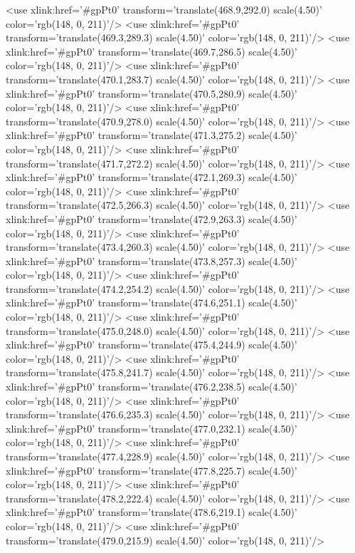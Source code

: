 	<use xlink:href='#gpPt0' transform='translate(468.9,292.0) scale(4.50)' color='rgb(148,   0, 211)'/>
	<use xlink:href='#gpPt0' transform='translate(469.3,289.3) scale(4.50)' color='rgb(148,   0, 211)'/>
	<use xlink:href='#gpPt0' transform='translate(469.7,286.5) scale(4.50)' color='rgb(148,   0, 211)'/>
	<use xlink:href='#gpPt0' transform='translate(470.1,283.7) scale(4.50)' color='rgb(148,   0, 211)'/>
	<use xlink:href='#gpPt0' transform='translate(470.5,280.9) scale(4.50)' color='rgb(148,   0, 211)'/>
	<use xlink:href='#gpPt0' transform='translate(470.9,278.0) scale(4.50)' color='rgb(148,   0, 211)'/>
	<use xlink:href='#gpPt0' transform='translate(471.3,275.2) scale(4.50)' color='rgb(148,   0, 211)'/>
	<use xlink:href='#gpPt0' transform='translate(471.7,272.2) scale(4.50)' color='rgb(148,   0, 211)'/>
	<use xlink:href='#gpPt0' transform='translate(472.1,269.3) scale(4.50)' color='rgb(148,   0, 211)'/>
	<use xlink:href='#gpPt0' transform='translate(472.5,266.3) scale(4.50)' color='rgb(148,   0, 211)'/>
	<use xlink:href='#gpPt0' transform='translate(472.9,263.3) scale(4.50)' color='rgb(148,   0, 211)'/>
	<use xlink:href='#gpPt0' transform='translate(473.4,260.3) scale(4.50)' color='rgb(148,   0, 211)'/>
	<use xlink:href='#gpPt0' transform='translate(473.8,257.3) scale(4.50)' color='rgb(148,   0, 211)'/>
	<use xlink:href='#gpPt0' transform='translate(474.2,254.2) scale(4.50)' color='rgb(148,   0, 211)'/>
	<use xlink:href='#gpPt0' transform='translate(474.6,251.1) scale(4.50)' color='rgb(148,   0, 211)'/>
	<use xlink:href='#gpPt0' transform='translate(475.0,248.0) scale(4.50)' color='rgb(148,   0, 211)'/>
	<use xlink:href='#gpPt0' transform='translate(475.4,244.9) scale(4.50)' color='rgb(148,   0, 211)'/>
	<use xlink:href='#gpPt0' transform='translate(475.8,241.7) scale(4.50)' color='rgb(148,   0, 211)'/>
	<use xlink:href='#gpPt0' transform='translate(476.2,238.5) scale(4.50)' color='rgb(148,   0, 211)'/>
	<use xlink:href='#gpPt0' transform='translate(476.6,235.3) scale(4.50)' color='rgb(148,   0, 211)'/>
	<use xlink:href='#gpPt0' transform='translate(477.0,232.1) scale(4.50)' color='rgb(148,   0, 211)'/>
	<use xlink:href='#gpPt0' transform='translate(477.4,228.9) scale(4.50)' color='rgb(148,   0, 211)'/>
	<use xlink:href='#gpPt0' transform='translate(477.8,225.7) scale(4.50)' color='rgb(148,   0, 211)'/>
	<use xlink:href='#gpPt0' transform='translate(478.2,222.4) scale(4.50)' color='rgb(148,   0, 211)'/>
	<use xlink:href='#gpPt0' transform='translate(478.6,219.1) scale(4.50)' color='rgb(148,   0, 211)'/>
	<use xlink:href='#gpPt0' transform='translate(479.0,215.9) scale(4.50)' color='rgb(148,   0, 211)'/>
